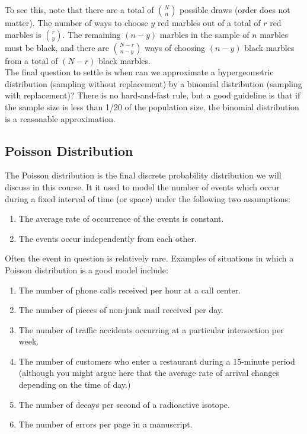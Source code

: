 \documentclass[notes.tex]{subfiles}
\begin{document}
To see this, note that there are a total of $\binom{N}{n}$ possible draws (order does not matter). The number of ways to choose $y$ red marbles out of a total of $r$ red marbles is $\binom{r}{y}$. The remaining $(n - y)$ marbles in the sample of $n$ marbles must be black, and there are $\binom{N - r}{n - y}$ ways of choosing $(n - y)$ black marbles from a total of $(N - r)$ black marbles. \\

The final question to settle is when can we approximate a hypergeometric distribution (sampling without replacement) by a binomial distribution (sampling with replacement)? There is no hard-and-fast rule, but a good guideline is that if the sample size is less than 1/20 of the population size, the binomial distribution is a reasonable approximation. 

\subsection{Poisson Distribution}

The Poisson distribution is the final discrete probability distribution we will discuss in this course. It it used to model the number of events which occur during a fixed interval of time (or space) under the following two assumptions:
\begin{enumerate}
\item The average rate of occurrence of the events is constant.
\item The events occur independently from each other.
\end{enumerate}
Often the event in question is relatively rare. Examples of situations in which a Poisson distribution is a good model include:
\begin{enumerate}
\item The number of phone calls received per hour at a call center.
\item The number of pieces of non-junk mail received per day.
\item The number of traffic accidents occurring at a particular intersection per week.
\item The number of customers who enter a restaurant during a 15-minute period (although you might argue here that the average rate of arrival changes depending on the time of day.)
\item The number of decays per second of a radioactive isotope.
\item The number of errors per page in a manuscript.
\end{enumerate}
\end{document}
